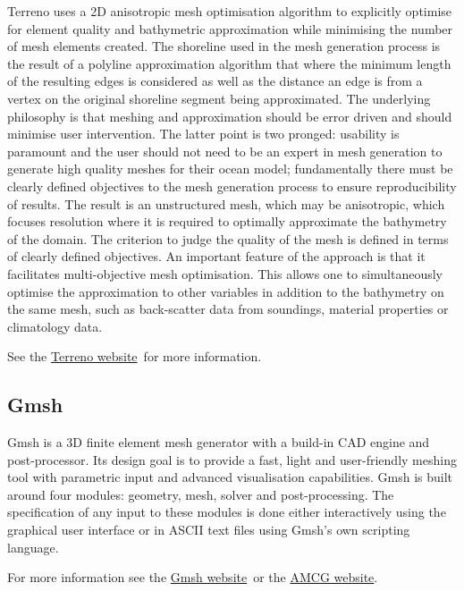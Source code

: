 Terreno uses a 2D anisotropic mesh optimisation algorithm to explicitly optimise for 
element quality and bathymetric approximation while minimising the number of mesh
elements created. The shoreline used in the mesh generation process is the result 
of a polyline approximation algorithm that where the minimum length of the resulting 
edges is considered as well as the distance an edge is from a vertex on the original 
shoreline segment being approximated. The underlying philosophy is that meshing and 
approximation should be error driven and should minimise user intervention. The 
latter point is two pronged: usability is paramount and the user should not need 
to be an expert in mesh generation to generate high quality meshes for their ocean 
model; fundamentally there must be clearly defined objectives to the mesh generation 
process to ensure reproducibility of results. The result is an unstructured mesh, 
which may be anisotropic, which focuses resolution where it is required to optimally 
approximate the bathymetry of the domain. The criterion to judge the quality of the 
mesh is defined in terms of clearly defined objectives. An important feature of the 
approach is that it facilitates multi-objective mesh optimisation. This allows one to 
simultaneously optimise the approximation to other variables in addition to the 
bathymetry on the same mesh, such as back-scatter data from soundings, material 
properties or climatology data. 

See the \href{http://amcg.ese.ic.ac.uk/terreno}{Terreno website}\ for more information.

\subsection{Gmsh}

Gmsh is a 3D finite element mesh generator with a build-in CAD engine and post-processor.
Its design goal is to provide a fast, light and user-friendly meshing tool with parametric
input and advanced visualisation capabilities. Gmsh is built around four modules: geometry, 
mesh, solver and post-processing. The specification of any input to these modules is done
either interactively using the graphical user interface or in ASCII text files using Gmsh's
own scripting language. 

For more information see the \href{http://geuz.org/gmsh/}{Gmsh website}\ or the \href{http://amcg.ese.ic.ac.uk}{AMCG
website}.

